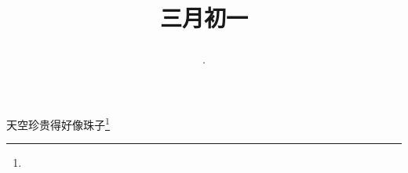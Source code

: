 \title{\date[d=9,m=4,y=2024][year:cn-y,年,month:cn,day:cn,日,·,weekday]·三月初一 }
天空珍贵得好像珠子\footnote{ }

